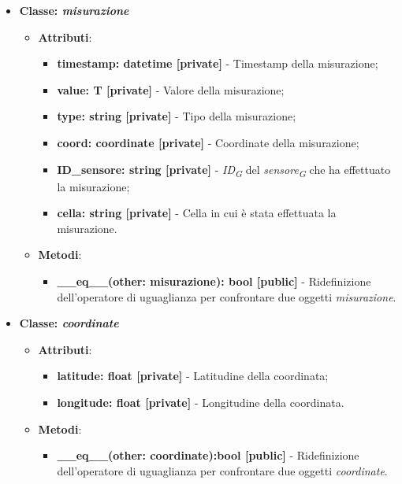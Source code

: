 \begin{itemize}
    \item{\textbf{Classe: \textit{misurazione}}}
    \begin{itemize}
        \item \textbf{Attributi}: 
        \begin{itemize}
            \item \textbf{timestamp: datetime [private]} - Timestamp della misurazione;
            \item \textbf{value: T [private]} - Valore della misurazione;
            \item \textbf{type: string [private]} - Tipo della misurazione;
            \item \textbf{coord: coordinate [private]} - Coordinate della misurazione;
            \item \textbf{ID\_sensore: string [private]} - \textit{ID}\textsubscript{\textit{G}} del \textit{sensore}\textsubscript{\textit{G}} che ha effettuato la misurazione;
            \item \textbf{cella: string [private]} - Cella in cui è stata effettuata la misurazione.
        \end{itemize}
        \item \textbf{Metodi}: 
        \begin{itemize}
            \item \textbf{\_\_eq\_\_(other: misurazione): bool [public]} - Ridefinizione dell'operatore di uguaglianza per confrontare due oggetti \textit{misurazione}.
        \end{itemize}
    \end{itemize}

    \item{\textbf{Classe: \textit{coordinate}}}
    \begin{itemize}
        \item \textbf{Attributi}: 
        \begin{itemize}
            \item \textbf{latitude: float [private]} - Latitudine della coordinata;
            \item \textbf{longitude: float [private]} - Longitudine della coordinata.
        \end{itemize}
        \item \textbf{Metodi}: 
        \begin{itemize}
            \item \textbf{\_\_eq\_\_(other: coordinate):bool [public]} - Ridefinizione dell'operatore di uguaglianza per confrontare due oggetti \textit{coordinate}.
        \end{itemize}
    \end{itemize}


\end{itemize}
